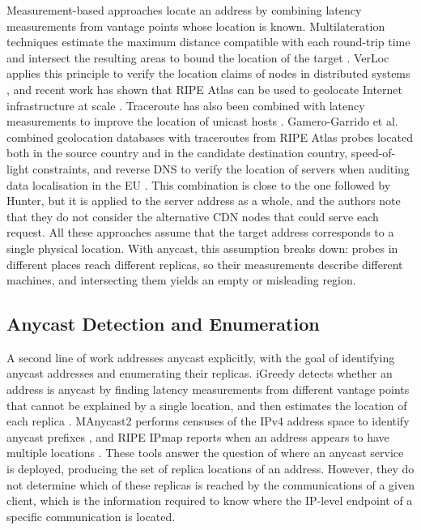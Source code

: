 Measurement-based approaches locate an address by combining latency measurements from vantage points whose location is known. Multilateration techniques estimate the maximum distance compatible with each round-trip time and intersect the resulting areas to bound the location of the target \cite{Ciavarrini2018GeolocationBound, Dan2021IPInterpolation}. VerLoc applies this principle to verify the location claims of nodes in distributed systems \cite{Kohls2022VerLoc:Systems}, and recent work has shown that RIPE Atlas can be used to geolocate Internet infrastructure at scale \cite{Candela2025UsingInfrastructure}. Traceroute has also been combined with latency measurements to improve the location of unicast hosts \cite{Cicalese2016Latency-BasedSets}. Gamero-Garrido et al. combined geolocation databases with traceroutes from RIPE Atlas probes located both in the source country and in the candidate destination country, speed-of-light constraints, and reverse DNS to verify the location of servers when auditing data localisation in the EU \cite{Gamero-Garrido2025EmpiricallyEU}. This combination is close to the one followed by Hunter, but it is applied to the server address as a whole, and the authors note that they do not consider the alternative CDN nodes that could serve each request. All these approaches assume that the target address corresponds to a single physical location. With anycast, this assumption breaks down: probes in different places reach different replicas, so their measurements describe different machines, and intersecting them yields an empty or misleading region.

\subsection{Anycast Detection and Enumeration}
\label{sc:hunter_sota_enumeration}

A second line of work addresses anycast explicitly, with the goal of identifying anycast addresses and enumerating their replicas. iGreedy detects whether an address is anycast by finding latency measurements from different vantage points that cannot be explained by a single location, and then estimates the location of each replica \cite{Cicalese2015AGeolocation}. MAnycast2 performs censuses of the IPv4 address space to identify anycast prefixes \cite{Sommese2020MAnycast2:Anycast}, and RIPE IPmap reports when an address appears to have multiple locations \cite{RIPEIPmap}. These tools answer the question of where an anycast service is deployed, producing the set of replica locations of an address. However, they do not determine which of these replicas is reached by the communications of a given client, which is the information required to know where the IP-level endpoint of a specific communication is located.

